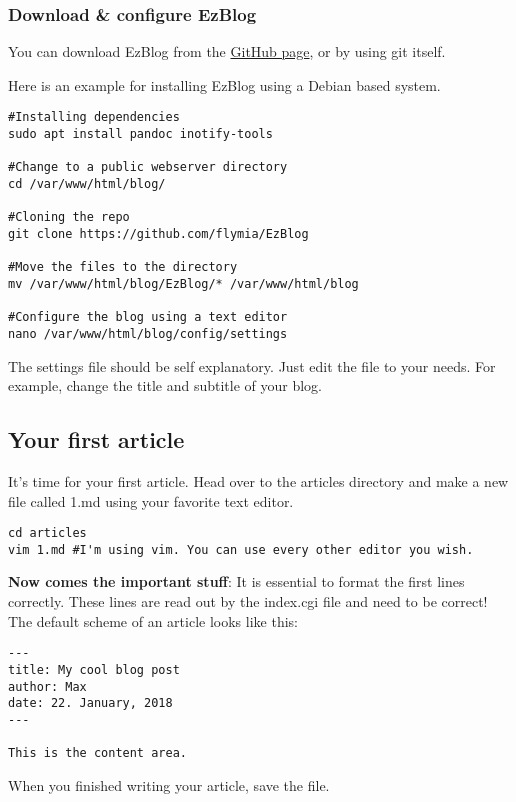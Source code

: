 \documentclass[12pt,a4paper]{article}
\begin{document}
\subsubsection{Download \& configure EzBlog}

You can download EzBlog from the \href{https://github.com/flymia/EzBlog}{GitHub page}, or by using git itself.

Here is an example for installing EzBlog using a Debian based system.
\begin{verbatim}
#Installing dependencies
sudo apt install pandoc inotify-tools

#Change to a public webserver directory
cd /var/www/html/blog/

#Cloning the repo
git clone https://github.com/flymia/EzBlog

#Move the files to the directory
mv /var/www/html/blog/EzBlog/* /var/www/html/blog

#Configure the blog using a text editor
nano /var/www/html/blog/config/settings
\end{verbatim}

The settings file should be self explanatory. Just edit the file to your needs. For example, change the title and subtitle of your blog.

\subsection{Your first article}

It's time for your first article. Head over to the articles directory and make a new file called 1.md using your favorite text editor.

\begin{verbatim}
cd articles
vim 1.md #I'm using vim. You can use every other editor you wish.
\end{verbatim}

\textbf{Now comes the important stuff}: It is essential to format the first lines correctly. These lines are read out by the index.cgi file and need to be correct! The default scheme of an article looks like this:

\begin{verbatim}
---
title: My cool blog post
author: Max
date: 22. January, 2018
---

This is the content area.

\end{verbatim}

When you finished writing your article, save the file.
\end{document}
